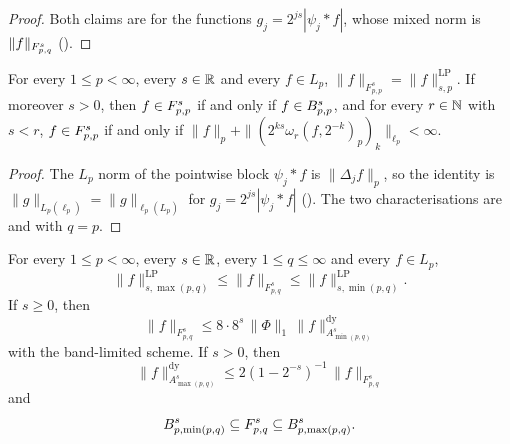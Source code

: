 \begin{proof}
\leanok
Both claims are  for the functions
$g_j = 2^{js} |\psi_j * f|$, whose mixed norm is $\|f\|_{F^{s}_{p,q}}$
().
\end{proof}

\begin{theorem}[$\TL{s}{p}{p} = \Besov{s}{p}{p}$]
\label{thm:tl-diagonal}
\leanok
{}
For every $1 \leq p < \infty$, every $s \in \mathbb{R}$ and every $f \in L_p$,
$\|f\|_{F^s_{p,p}} = \|f\|^{\mathrm{LP}}_{s,p}$. If moreover $s > 0$, then $f \in F^{s}_{p,p}$ if
and only if $f \in B^{s}_{p,p}$, and for every $r \in \mathbb{N}$ with $s < r$, $f \in F^{s}_{p,p}$ if
and only if $\|f\|_p + \|(2^{ks} \omega_r(f, 2^{-k})_p)_k\|_{\ell_p} < \infty$.
\end{theorem}

\begin{proof}
\leanok
The $L_p$ norm of the pointwise block $\psi_j * f$ is $\|\Delta_j f\|_p$, so the identity is
$\|g\|_{L_p(\ell_p)} = \|g\|_{\ell_p(L_p)}$ for $g_j = 2^{js} |\psi_j * f|$
(). The two characterisations are  and
 with $q = p$.
\end{proof}

\begin{theorem}
\label{thm:tl-besov-sandwich}
\leanok
{}
For every $1 \leq p < \infty$, every $s \in \mathbb{R}$, every $1 \leq q \leq \infty$ and every
$f \in L_p$,
\[
  \|f\|^{\mathrm{LP}}_{s,\max(p,q)} \leq \|f\|_{F^s_{p,q}} \leq \|f\|^{\mathrm{LP}}_{s,\min(p,q)} .
\]
If $s \geq 0$, then
\[
  \|f\|_{F^s_{p,q}} \leq 8 \cdot 8^s \, \|\Phi\|_1 \, \|f\|^{\mathrm{dy}}_{A^s_{\min(p,q)}}
\]
with the band-limited scheme. If $s > 0$, then
\[
  \|f\|^{\mathrm{dy}}_{A^s_{\max(p,q)}} \leq 2 (1 - 2^{-s})^{-1} \, \|f\|_{F^s_{p,q}}
\]
and
\[
  B^{s}_{p,\min(p,q)} \subseteq F^{s}_{p,q} \subseteq B^{s}_{p,\max(p,q)} .
\]
\end{theorem}

